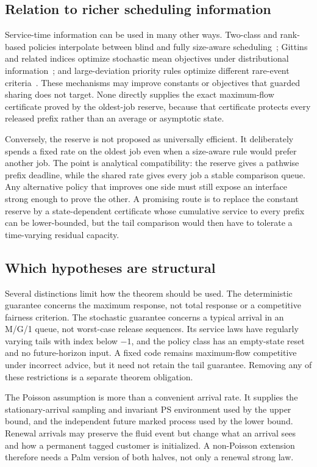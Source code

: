 \subsection{Relation to richer scheduling information}
Service-time information can be used in many other ways.  Two-class and rank-based policies interpolate between blind and fully size-aware scheduling~\cite{chen2021,scully2018soap}; Gittins and related indices optimize stochastic mean objectives under distributional information~\cite{gittins2011,aalto2009,scully2020gittins}; and large-deviation priority rules optimize different rare-event criteria~\cite{stolyar2001}.  These mechanisms may improve constants or objectives that guarded sharing does not target.  None directly supplies the exact maximum-flow certificate proved by the oldest-job reserve, because that certificate protects every released prefix rather than an average or asymptotic state.

Conversely, the reserve is not proposed as universally efficient.  It deliberately spends a fixed rate on the oldest job even when a size-aware rule would prefer another job.  The point is analytical compatibility: the reserve gives a pathwise prefix deadline, while the shared rate gives every job a stable comparison queue.  Any alternative policy that improves one side must still expose an interface strong enough to prove the other.  A promising route is to replace the constant reserve by a state-dependent certificate whose cumulative service to every prefix can be lower-bounded, but the tail comparison would then have to tolerate a time-varying residual capacity.

\subsection{Which hypotheses are structural}
Several distinctions limit how the theorem should be used. The deterministic guarantee concerns the maximum response, not total response or a competitive fairness criterion. The stochastic guarantee concerns a typical arrival in an M/G/1 queue, not worst-case release sequences. Its service laws have regularly varying tails with index below $-1$, and the policy class has an empty-state reset and no future-horizon input. A fixed code remains maximum-flow competitive under incorrect advice, but it need not retain the tail guarantee. Removing any of these restrictions is a separate theorem obligation.

The Poisson assumption is more than a convenient arrival rate.  It supplies the stationary-arrival sampling and invariant PS environment used by the upper bound, and the independent future marked process used by the lower bound.  Renewal arrivals may preserve the fluid event but change what an arrival sees and how a permanent tagged customer is initialized.  A non-Poisson extension therefore needs a Palm version of both halves, not only a renewal strong law.

